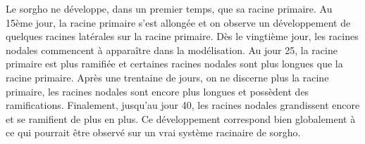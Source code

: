 Le sorgho ne développe, dans un premier temps, que sa racine primaire.
Au 15ème jour, la racine primaire s'est allongée et on observe un développement de quelques racines latérales sur la racine primaire.
Dès le vingtième jour, les racines nodales commencent à apparaître dans la modélisation.
Au jour 25, la racine primaire est plus ramifiée et certaines racines nodales sont plus longues que la racine primaire.
Après une trentaine de jours, on ne discerne plus la racine primaire, les racines nodales sont encore plus longues et possèdent des ramifications.
Finalement, jusqu'au jour 40, les racines nodales grandissent encore et se ramifient de plus en plus.
Ce développement correspond bien globalement à ce qui pourrait être observé sur un vrai système racinaire de sorgho.
